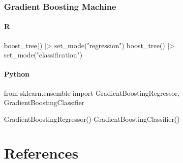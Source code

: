 \documentclass[
  letterpaper,
  DIV=11,
  numbers=noendperiod]{scrreprt}
\newenvironment{Shaded}{\begin{snugshade}}{\end{snugshade}}
\newcommand{\FunctionTok}[1]{\textcolor[rgb]{0.28,0.35,0.67}{#1}}
\newcommand{\ImportTok}[1]{\textcolor[rgb]{0.00,0.46,0.62}{#1}}
\newcommand{\NormalTok}[1]{\textcolor[rgb]{0.00,0.46,0.62}{#1}}
\newcommand{\SpecialCharTok}[1]{\textcolor[rgb]{0.37,0.37,0.37}{#1}}
\newcommand{\StringTok}[1]{\textcolor[rgb]{0.13,0.47,0.30}{#1}}
\newlength{\cslhangindent}
\newlength{\cslentryspacingunit} %
\newenvironment{CSLReferences}[2] %
 {%
  \setlength{\parindent}{0pt}
  \ifodd #1
  \let\oldpar\par
  \def\par{\hangindent=\cslhangindent\oldpar}
  \fi
  \setlength{\parskip}{#2\cslentryspacingunit}
 }%
 {}
\begin{document}
\hypertarget{gradient-boosting-machine}{%
\subsection{Gradient Boosting Machine}\label{gradient-boosting-machine}}

\hypertarget{r-79}{%
\subsubsection{R}\label{r-79}}

\begin{Shaded}
\begin{Highlighting}[]
\FunctionTok{boost\_tree}\NormalTok{() }\SpecialCharTok{|\textgreater{}} \FunctionTok{set\_mode}\NormalTok{(}\StringTok{"regression"}\NormalTok{)}
\FunctionTok{boost\_tree}\NormalTok{() }\SpecialCharTok{|\textgreater{}} \FunctionTok{set\_mode}\NormalTok{(}\StringTok{"classification"}\NormalTok{)}
\end{Highlighting}
\end{Shaded}

\hypertarget{python-79}{%
\subsubsection{Python}\label{python-79}}

\begin{Shaded}
\begin{Highlighting}[]
\ImportTok{from}\NormalTok{ sklearn.ensemble }\ImportTok{import}\NormalTok{ GradientBoostingRegressor, GradientBoostingClassifier}

\NormalTok{GradientBoostingRegressor()}
\NormalTok{GradientBoostingClassifier()}
\end{Highlighting}
\end{Shaded}

\hypertarget{references}{%
\chapter*{References}\label{references}}

\hypertarget{refs}{}
\begin{CSLReferences}{0}{0}
\end{CSLReferences}
\end{document}
